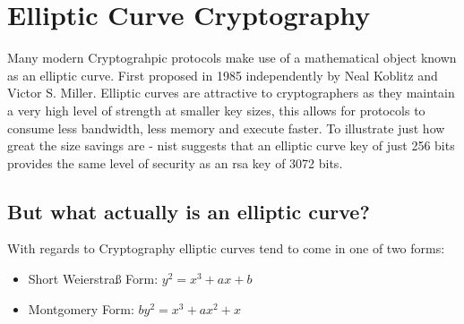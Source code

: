 \section{Elliptic Curve Cryptography}
Many modern Cryptograhpic protocols make use of a mathematical object known as an elliptic curve.
First proposed in 1985 independently by Neal Koblitz\cite{ecc-first-use-koblitz} and Victor S. Miller\cite{ecc-first-use-miller}.
Elliptic curves are attractive to cryptographers as they maintain a very high level of strength at smaller key sizes, this allows for protocols to consume less bandwidth, less memory and execute faster\cite{state-of-ecc}.
To illustrate just how great the size savings are - \gls{nist} suggests that an elliptic curve key of just 256 bits provides the same level of security as an \gls{rsa} key of 3072 bits\cite{nist-ecc-reqs}.

\subsection{But what actually is an elliptic curve?}
With regards to Cryptography elliptic curves tend to come in one of two forms:
\begin{itemize}
  \item Short Weierstra\ss{} Form: $y^2 = x^3 + ax + b$
  \item Montgomery Form: $by^2 = x^3 + ax^2 + x$
\end{itemize}

